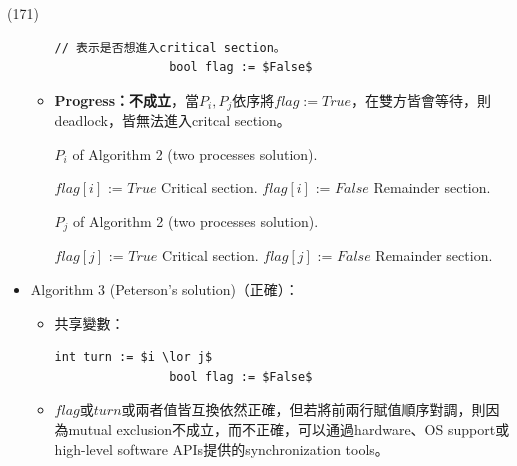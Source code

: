 \begin{theorem}{(171)}
\begin{itemize}
\begin{itemize}
\begin{lstlisting}[caption={Shared variables of Algorithm 2 (two processes solution).}, captionpos=b, mathescape=true]
                // 表示是否想進入critical section。
                bool flag := $False$
            \end{lstlisting}
            \item \textbf{Progress：不成立}，當$P_i, P_j$依序將$flag := True$，在雙方皆會等待，則deadlock，皆無法進入critcal section。
            \begin{algorithm}[H]
                \caption{$P_i$ of Algorithm 2 (two processes solution).}
                \begin{algorithmic}[1]
                        \Repeat 
                            \State $flag[i]$ := $True$
                            \EndWhile
                            \State Critical section.
                            \State $flag[i]$ := $False$
                            \State Remainder section.
                    \EndFunction
                \end{algorithmic}
            \end{algorithm} 
            \begin{algorithm}[H]
                \caption{$P_j$ of Algorithm 2 (two processes solution).}
                \begin{algorithmic}[1]
                        \Repeat 
                            \State $flag[j]$ := $True$
                            \EndWhile
                            \State Critical section.
                            \State $flag[j]$ := $False$
                            \State Remainder section.
                    \EndFunction
                \end{algorithmic}
            \end{algorithm} 
        \end{itemize}
        \item Algorithm 3 (Peterson's solution)（正確）：\begin{itemize}
            \item 共享變數：\begin{lstlisting}[caption={Shared variables of Peterson's solution (two processes solution).}, captionpos=b, mathescape=true]
                int turn := $i \lor j$
                bool flag := $False$
            \end{lstlisting}
            \item $flag$或$turn$或兩者值皆互換依然正確，但若將前兩行賦值順序對調，則因為mutual exclusion不成立，而不正確，可以通過hardware、OS support或high-level software APIs提供的synchronization tools。

\end{itemize}
\end{itemize}
\end{theorem}
